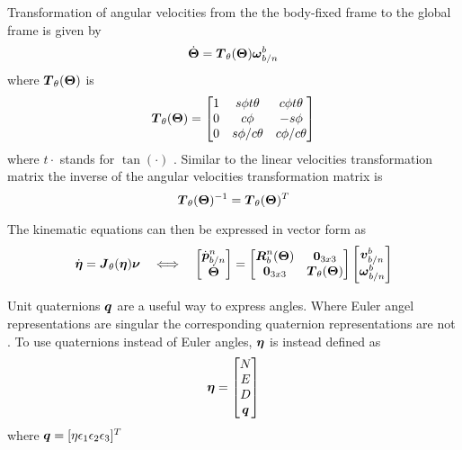 Transformation of angular velocities from the the body-fixed frame to the global frame is given by 
\begin{equation}\label{eq:eulerAnglesdot}
\dot{\boldsymbol{\Theta}} = \boldsymbol{T}_{\theta}(\boldsymbol{\Theta})\boldsymbol{\omega}^b_{b/n}
\end{equation}
where $\boldsymbol{T}_{\theta}(\boldsymbol{\Theta})$ is 
\begin{equation}
\boldsymbol{T}_{\theta}(\boldsymbol{\Theta}) = \begin{bmatrix}
1 & s\phi t\theta & c\phi t\theta \\
0 & c\phi & -s\phi \\
0 & s\phi/c\theta & c\phi/c\theta
\end{bmatrix}
\end{equation}
where $t\cdot$ stands for $\tan(\cdot)$ \citep[p. 24-25]{fossen2011}. Similar to the linear velocities transformation matrix the inverse of the angular velocities transformation matrix is
\begin{equation}
\boldsymbol{T}_{\theta}(\boldsymbol{\Theta})^{-1} = \boldsymbol{T}_{\theta}(\boldsymbol{\Theta})^T
\end{equation}

The kinematic equations can then be expressed in vector form as 
\begin{equation} \label{eq:kinematicsticsEuler}
\dot{\boldsymbol{\eta}} = \boldsymbol{J}_\theta(\boldsymbol{\eta})\boldsymbol{\nu}
\quad\Longleftrightarrow\quad
\begin{bmatrix}
\dot{\boldsymbol{p}}^n_{b/n} \\
\dot{\boldsymbol{\Theta}}
\end{bmatrix}
=
\begin{bmatrix}
\boldsymbol{R}^n_b(\boldsymbol{\Theta}) & \boldsymbol{0}_{3x3} \\
\boldsymbol{0}_{3x3} & \boldsymbol{T}_\theta(\boldsymbol{\Theta})
\end{bmatrix}
\begin{bmatrix}
\boldsymbol{v}^b_{b/n} \\
\boldsymbol{\omega}^b_{b/n}
\end{bmatrix}
\end{equation}



 
Unit quaternions $\boldsymbol{q}$ are a useful way to express angles. Where Euler angel representations are singular the corresponding quaternion representations are not \citep{sensorfusion}. To use quaternions instead of Euler angles, $\boldsymbol{\eta}$ is instead defined as
\begin{equation}
\boldsymbol{\eta} = \begin{bmatrix}
N \\
E \\
D \\
\boldsymbol{q}
\end{bmatrix}
\end{equation} where $\boldsymbol{q} =[\eta \epsilon_1 \epsilon_2 \epsilon_3]^T$

